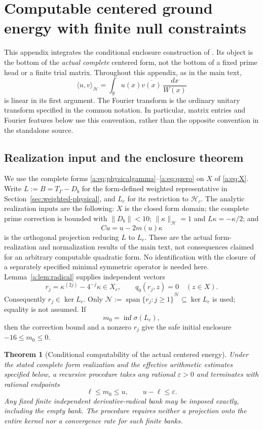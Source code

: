 \documentclass[11pt,a4paper]{article}
\numberwithin{equation}{section}
\newtheorem{theorem}{Theorem}[section]
\theoremstyle{definition}\newtheorem{definition}[theorem]{Definition}
\theoremstyle{remark}\newtheorem{remark}[theorem]{Remark}
\newcommand{\R}{\mathbb R}\newcommand{\C}{\mathbb C}\newcommand{\N}{\mathbb N}
\newcommand{\Hh}{\mathcal H}\newcommand{\Hw}{\mathcal H}
\newcommand{\ip}[2]{\langle#1,#2\rangle}\newcommand{\norm}[1]{\lVert#1\rVert}\newcommand{\abs}[1]{\lvert#1\rvert}
\newcommand{\Nn}{\mathcal N}\newcommand{\Ii}{\mathcal I}\newcommand{\Zz}{\mathcal Z}
\begin{document}
\section{Computable centered ground energy with finite null constraints}
\label{vfourC:section}

This appendix integrates the conditional enclosure construction of
\cite{vfourComputable}.  Its object is the bottom of the \emph{actual complete}
centered form, not the bottom of a fixed prime head or a finite trial matrix.
Throughout this appendix, as in the main text,
\[
 \ip{u}{v}_{\Hh}=\int_{\R}u(x)\overline{v(x)}\,\frac{dx}{W(x)}
\]
is linear in its first argument.  The Fourier transform is the ordinary unitary
transform specified in the common notation.  In particular, matrix entries and
Fourier features below use this convention, rather than the opposite convention
in the standalone source.

\subsection{Realization input and the enclosure theorem}
\label{vfourC:subsec:input}

We use the complete forms \eqref{a:eq:physicalgamma}--\eqref{a:eq:qzero} on
$X$ of \eqref{a:eq:X}.  Write $L:=B=T_\Gamma-D_b$ for the form-defined weighted
representative in Section~\ref{sec:weighted-physical}, and $L_c$ for its
restriction to $\Hh_c$.  The analytic realization inputs are the following:
$X$ is the closed form domain; the complete prime correction is bounded with
$\norm{D_b}<10$; $\norm\kappa_{\Hh}=1$ and $L\kappa=-\kappa/2$; and
\[
 Cu=u-2m(u)\kappa
\]
is the orthogonal projection reducing $L$ to $L_c$.  These are the actual
form-realization and normalization results of the main text, not consequences
claimed for an arbitrary computable quadratic form.  No identification with the
closure of a separately specified minimal symmetric operator is needed here.
Lemma~\ref{a:lem:radical} supplies independent vectors
\[
 r_j=\kappa^{(2j)}-4^{-j}\kappa\in X_c,
 \qquad q_0(r_j,z)=0\quad(z\in X).
\]
Consequently $r_j\in\ker L_c$.  Only
$\Nn:=\overline{\operatorname{span}\{r_j:j\ge1\}}^{\Hh}
\subseteq\ker L_c$ is used; equality is not assumed.  If
\begin{equation}\label{vfourC:eq:mzero}
 m_0=\inf\sigma(L_c),
\end{equation}
then the correction bound and a nonzero $r_j$ give the safe initial enclosure
$-16\le m_0\le0$.

\begin{theorem}[Conditional computability of the actual centered energy]
\label{vfourC:thm:computable}
Under the stated complete form realization and the effective arithmetic
estimates specified below, a recursive procedure takes any rational
$\varepsilon>0$ and terminates with rational endpoints
\[
 \ell\le m_0\le u,\qquad u-\ell\le\varepsilon.
\]
Any fixed finite independent derivative-radical bank may be imposed exactly,
including the empty bank.  The procedure requires neither a projection onto the
entire kernel nor a convergence rate for such finite banks.
\end{theorem}
\end{document}
